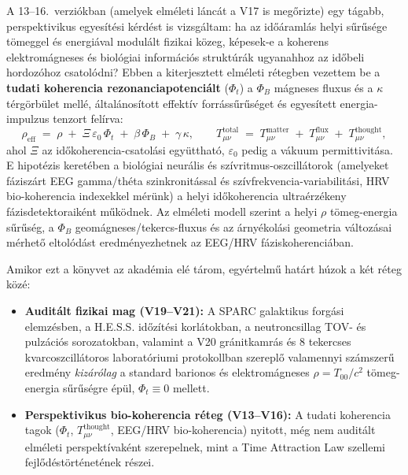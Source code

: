 \documentclass[10pt,a4paper]{article}
\begin{document}
\par
A 13--16.\ verzi\'okban (amelyek elm\'eleti l\'anc\'at a V17 is meg\H{o}rizte) egy t\'agabb, perspektivikus egyes\'it\'esi k\'erd\'est is vizsg\'altam: ha az id\H{o}\'araml\'as helyi s\H{u}r\H{u}s\'ege t\"omeggel \'es energi\'aval modul\'alt fizikai k\"ozeg, k\'epesek-e a koherens elektrom\'agneses \'es biol\'ogiai inform\'aci\'os strukt\'ur\'ak ugyanahhoz az id\H{o}beli hordoz\'ohoz csatol\'odni? Ebben a kiterjesztett elm\'eleti r\'etegben vezettem be a \textbf{tudati koherencia rezonanciapotenci\'alt} ($\Phi_t$) a $\Phi_B$ m\'agneses fluxus \'es a $\kappa$ t\'erg\"orb\"ulet mell\'e, \'altal\'anos\'itott effekt\'iv forr\'ass\H{u}r\H{u}s\'eget \'es egyes\'itett energia-impulzus tenzort fel\'irva:
\begin{equation}
  \rho_{\text{eff}} \;=\; \rho \;+\; \Xi\,\varepsilon_0\,\Phi_t \;+\; \beta\,\Phi_B \;+\; \gamma\,\kappa, \qquad
  T_{\mu\nu}^{\text{total}} \;=\; T_{\mu\nu}^{\text{matter}} \;+\; T_{\mu\nu}^{\text{flux}} \;+\; T_{\mu\nu}^{\text{thought}},
\end{equation}
ahol $\Xi$ az id\H{o}koherencia-csatol\'asi egy\"utthat\'o, $\varepsilon_0$ pedig a v\'akuum permittivit\'asa. E hipot\'ezis keret\'eben a biol\'ogiai neur\'alis \'es sz\'ivritmus-oszcill\'atorok (amelyeket f\'azisz\'art EEG gamma/th\'eta szinkronit\'assal \'es sz\'ivfrekvencia-variabilit\'asi, HRV bio-koherencia indexekkel m\'er\"unk) a helyi id\H{o}koherencia ultra\'erz\'ekeny f\'azisdetektoraik\'ent m\H{u}k\"odnek. Az elm\'eleti modell szerint a helyi $\rho$ t\"omeg-energia s\H{u}r\H{u}s\'eg, a $\Phi_B$ geom\'agneses/tekercs-fluxus \'es az \'arny\'ekol\'asi geometria v\'altoz\'asai m\'erhet\H{o} eltol\'od\'ast eredm\'enyezhetnek az EEG/HRV f\'aziskoherenci\'aban.

\par
Amikor ezt a k\"onyvet az akad\'emia el\'e t\'arom, egy\'ertelm\H{u} hat\'art h\'uzok a k\'et r\'eteg k\"oz\'e:
\begin{itemize}\setlength{\itemsep}{1.5pt}\setlength{\parskip}{0pt}\setlength{\topsep}{1pt}
  \item \textbf{Audit\'alt fizikai mag (V19--V21):} A SPARC galaktikus forg\'asi elemz\'esben, a H.E.S.S. id\H{o}z\'it\'esi korl\'atokban, a neutroncsillag TOV- \'es pulz\'aci\'os sorozatokban, valamint a V20 gr\'anitkamr\'as \'es 8 tekercses kvarcoszcill\'atoros laborat\'oriumi protokollban szerepl\H{o} valamennyi sz\'amszer\H{u} eredm\'eny \emph{kiz\'ar\'olag} a standard barionos \'es elektrom\'agneses $\rho = T_{00}/c^2$ t\"omeg-energia s\H{u}r\H{u}s\'egre \'ep\"ul, $\Phi_t \equiv 0$ mellett.
  \item \textbf{Perspektivikus bio-koherencia r\'eteg (V13--V16):} A tudati koherencia tagok ($\Phi_t$, $T_{\mu\nu}^{\text{thought}}$, EEG/HRV bio-koherencia) nyitott, m\'eg nem audit\'alt elm\'eleti perspekt\'ivak\'ent szerepelnek, mint a Time Attraction Law szellemi fejl\H{o}d\'est\"ort\'enet\'enek r\'eszei.
\end{itemize}
\newpage
\end{document}
